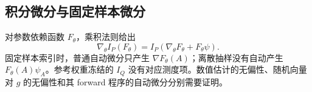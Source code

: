 \subsection{积分微分与固定样本微分}
\label{est:measure-derivative}
对参数依赖函数 $F_\theta$，乘积法则给出
\begin{equation}
\nabla_\theta I_P(F_\theta)
=I_P(\nabla_\theta F_\theta+F_\theta\psi).
\label{est:eq:kl-measure-derivative}
\end{equation}
固定样本索引时，普通自动微分只产生 $\nabla F_\theta(A)$；离散抽样没有自动产生 $F_\theta(A)\psi_A$。参考权重冻结的 $I_Q$ 没有对应测度项。数值估计的无偏性、随机向量对 $g$ 的无偏性和其 forward 程序的自动微分分别需要证明。
